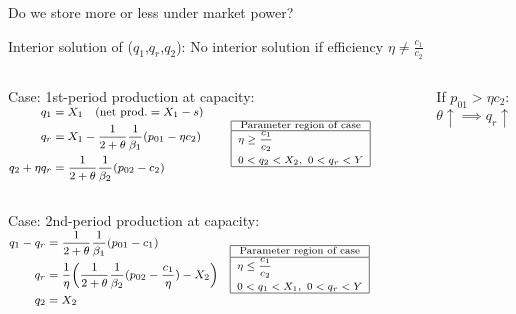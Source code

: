 \documentclass[aspectratio=169,t]{beamer}  %
\begin{document}
\begin{frame}{Do we store more or less under market power?}
\begin{block}{Interior solution of ($q_1$,$q_r$,$q_2$):}
No interior solution if efficiency $\eta\neq\frac{c_1}{c_2}$
\end{block}
\begin{columns}
 
\begin{block}{Case: 1st-period production at capacity:}
$
\renewcommand{\arraystretch}{.7}
\footnotesize 
\begin{aligned}  
      q_1  &= X_1 \quad (\text{net prod.}=X_1-s)\\
     q_r & = X_1-\frac{1}{2+\theta} \frac{1}{\beta_1}(p_{01}-\eta c_2) \\
     q_2 + \eta q_r  & = \frac{1}{2+\theta} \frac{1}{\beta_2}(p_{02}-c_2) 
     \end{aligned}\qquad\
\scriptsize 
\begin{array}{|c|} 
    \hline
    \text{Parameter region of case} \\ \hline    
    {\begin{aligned} 
             & \eta \geq \frac{c_1}{c_2} \\
             & 0 < q_2 < X_2,\ 0 < q_r < Y 
    \end{aligned}} \\ \hline 
\end{array}
$
\end{block}

If $p_{01}>\eta c_2$:\\
\qquad $\theta\uparrow \implies q_r\uparrow$
\end{columns} 

\vspace{-1ex}

\begin{columns}
\begin{block}{Case: 2nd-period production at capacity:}
$
\footnotesize 
\begin{aligned}  
      q_1 - q_r  &= \frac{1}{2+\theta} \frac{1}{\beta_1}(p_{01}-c_1)\\
       q_r & = \frac{1}{\eta}\biggl(\frac{1}{2+\theta} \frac{1}{\beta_2}(p_{02}-\frac{c_1}{\eta})-X_2\biggr) \\
     q_2  & = X_2 
     \end{aligned}\quad
\scriptsize      
\begin{array}{|c|l|} 
\hline     
 \text{Parameter region of case} \\ \hline    
        {\begin{aligned} 
             & \eta \leq \frac{c_1}{c_2} \\
             & 0 < q_1 < X_1,\ 0 < q_r < Y 
    \end{aligned}} \\ \hline 
\end{array}
\renewcommand{\arraystretch}{1}
$  
\end{block}


\end{columns}
\end{frame}
\end{document}
